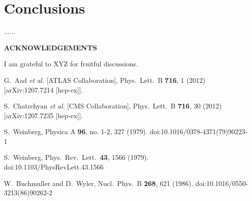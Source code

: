 \documentclass[10pt]{article}
\def\Acknowledgements{\bigskip  \bigskip \begin{center} \begin{large}
             \bf ACKNOWLEDGEMENTS \end{large}\end{center}}
\begin{document}


\section{Conclusions}

...... 

\Acknowledgements
I am grateful to XYZ for fruitful discussions.


\begin{thebibliography}{99}


  G.~Aad {\it et al.}  [ATLAS Collaboration],
  Phys.\ Lett.\ B {\bf 716}, 1 (2012)
  [arXiv:1207.7214 [hep-ex]].
  
  
  S.~Chatrchyan {\it et al.}  [CMS Collaboration],
  Phys.\ Lett.\ B {\bf 716}, 30 (2012)
  [arXiv:1207.7235 [hep-ex]].

  S.~Weinberg,
  Physica A {\bf 96}, no. 1-2, 327 (1979).
  doi:10.1016/0378-4371(79)90223-1

  S.~Weinberg,
  Phys.\ Rev.\ Lett.\  {\bf 43}, 1566 (1979).
  doi:10.1103/PhysRevLett.43.1566

  W.~Buchmuller and D.~Wyler,
  Nucl.\ Phys.\ B {\bf 268}, 621 (1986).
  doi:10.1016/0550-3213(86)90262-2


\end{thebibliography}
\end{document}
